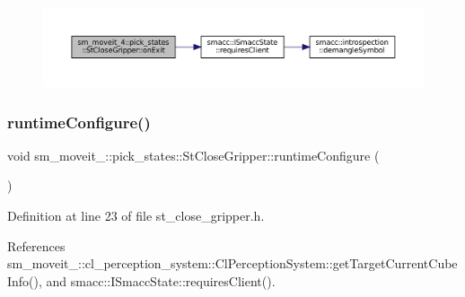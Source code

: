 \begin{figure}[H]
\begin{center}
\leavevmode
\includegraphics[width=350pt]{structsm__moveit__4_1_1pick__states_1_1StCloseGripper_a427f4aec6a2173899b55e6a45ca28773_cgraph}
\end{center}
\end{figure}
\mbox{\label{structsm__moveit__4_1_1pick__states_1_1StCloseGripper_af3be0f07cd47254137be3f0eb049e90f}} 
\subsubsection{\texorpdfstring{runtime\+Configure()}{runtimeConfigure()}}
{\footnotesize\ttfamily void sm\+\_\+moveit\+\_\+::pick\+\_\+states\+::\+St\+Close\+Gripper\+::runtime\+Configure (\begin{DoxyParamCaption}{ }\end{DoxyParamCaption})\hspace{0.3cm}{\ttfamily [inline]}}



Definition at line 23 of file st\+\_\+close\+\_\+gripper.\+h.



References sm\+\_\+moveit\+\_\+::cl\+\_\+perception\+\_\+system\+::\+Cl\+Perception\+System\+::get\+Target\+Current\+Cube\+Info(), and smacc\+::\+I\+Smacc\+State\+::requires\+Client().


